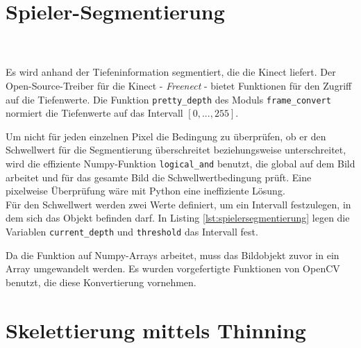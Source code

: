 \section{Spieler-Segmentierung}
\\\\
Es wird anhand der Tiefeninformation segmentiert, die die Kinect liefert. Der Open-Source-Treiber für die Kinect - \emph{Freenect} - bietet Funktionen für den Zugriff auf die
Tiefenwerte. Die Funktion \texttt{pretty\_depth} des Moduls
\texttt{frame\_convert} normiert die Tiefenwerte auf das 
Intervall $[0,...,255]$. 

Um nicht für jeden einzelnen Pixel die Bedingung zu überprüfen, ob er den Schwellwert für die Segmentierung überschreitet beziehungsweise unterschreitet, wird die effiziente Numpy-Funktion \texttt{logical\_and} benutzt, die global auf dem Bild arbeitet und für das gesamte Bild die Schwellwertbedingung prüft. Eine pixelweise Überprüfung wäre mit Python eine ineffiziente Lösung.\\ Für den Schwellwert werden zwei 
Werte definiert, um ein Intervall festzulegen, in dem sich das Objekt befinden darf. In Listing \ref{lst:spielersegmentierung} legen die Variablen \texttt{current\_depth} und \texttt{threshold} das Intervall fest. 

Da die Funktion auf Numpy-Arrays arbeitet, muss das Bildobjekt zuvor in ein Array umgewandelt werden. 
Es wurden vorgefertigte Funktionen von OpenCV benutzt, die diese Konvertierung vornehmen. 
\section{Skelettierung mittels Thinning} 
\label{implThinning}

